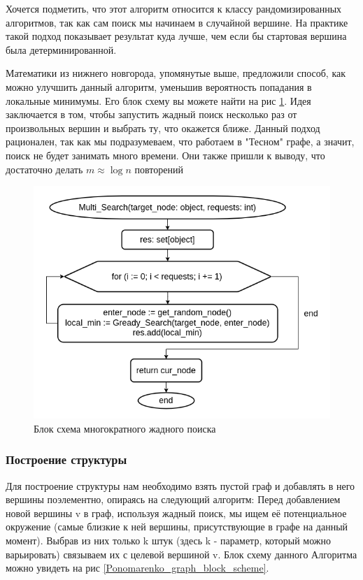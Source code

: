 Хочется подметить, что этот алгоритм относится к классу рандомизированных алгоритмов,
так как сам поиск мы начинаем в случайной вершине. На практике такой подход показывает
результат куда лучше, чем если бы стартовая вершина была детерминированной.


Математики из нижнего новгорода, упомянутые выше, предложили способ, как можно улучшить
данный алгоритм, уменьшив вероятность попадания в локальные минимумы. Его блок схему
вы можете найти на рис \ref{multi_search_block_scheme}. Идея заключается в том, чтобы
запустить жадный поиск несколько раз от произвольных вершин и выбрать ту, что окажется ближе.
Данный подход рационален, так как мы подразумеваем, что работаем в "Тесном" графе, а значит,
поиск не будет занимать много времени. Они также пришли к выводу, что достаточно делать
$m \approx \log{n}$ повторений

\begin{figure}[H]
    \centering
    \includegraphics[scale=0.6]{./pictures/Multi_Search.png}
    \caption{Блок схема многократного жадного поиска} \label{multi_search_block_scheme}
\end{figure}

\subsubsection{Построение структуры}

Для построение структуры нам необходимо взять пустой граф и добавлять в него вершины
поэлементно, опираясь на следующий алгоритм: Перед добавлением новой вершины v в граф, 
используя жадный поиск, мы ищем её потенциальное окружение (самые близкие к ней вершины,
присутствующие в графе на данный момент). Выбрав из них только k штук (здесь k - параметр, который
можно варьировать) связываем их с целевой вершиной v. Блок схему данного Алгоритма можно
увидеть на рис \ref{Ponomarenko_graph_block_scheme}.

